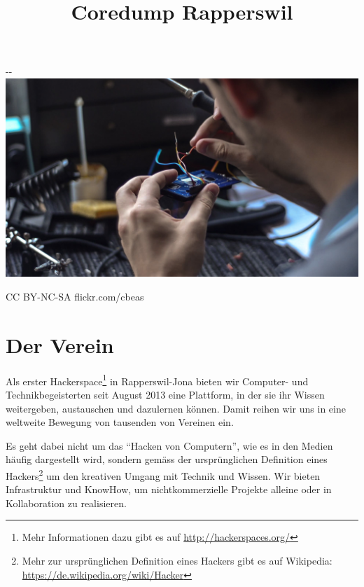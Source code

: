 \documentclass[10pt,a4paper,parskip,fleqn]{scrartcl}
\title{\Huge Coredump Rapperswil}
\begin{document}
\begin{titlepage}

	\maketitle

	\vspace{2cm}

	\begin{adjustwidth}{-\oddsidemargin-1in}{-\rightmargin-1in}
		\includegraphics[width=\paperwidth]{soldering.jpg}

		\vspace{-12mm}

		\hfill {\scriptsize \color{light-gray} CC BY-NC-SA flickr.com/cbeas}
	\end{adjustwidth}

	\vfill

\end{titlepage}

\section{Der Verein}

Als erster Hackerspace\footnote{Mehr Informationen dazu gibt es auf
\url{http://hackerspaces.org/}} in Rapperswil-Jona bieten wir Computer- und
Technikbegeisterten seit August 2013 eine Plattform, in der sie ihr Wissen
weitergeben, austauschen und dazulernen können. Damit reihen wir uns in eine
weltweite Bewegung von tausenden von Vereinen ein.

Es geht dabei nicht um das ``Hacken von Computern'', wie es in den Medien häufig
dargestellt wird, sondern gemäss der ursprünglichen Definition eines
Hackers\footnote{Mehr zur ursprünglichen Definition eines Hackers gibt es auf
Wikipedia: \url{https://de.wikipedia.org/wiki/Hacker}} um den kreativen Umgang
mit Technik und Wissen. Wir bieten Infrastruktur und KnowHow, um
nichtkommerzielle Projekte alleine oder in Kollaboration zu realisieren.
\end{document}
